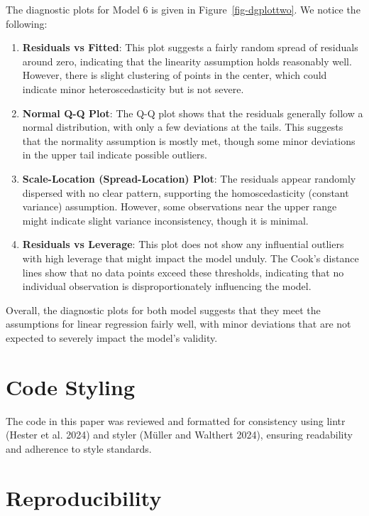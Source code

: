 \documentclass[
  letterpaper,
  DIV=11,
  numbers=noendperiod]{scrartcl}
\begin{document}
The diagnostic plots for Model 6 is given in Figure~\ref{fig-dgplottwo}.
We notice the following:

\begin{enumerate}
\def\labelenumi{\arabic{enumi}.}
\item
  \textbf{Residuals vs Fitted}: This plot suggests a fairly random
  spread of residuals around zero, indicating that the linearity
  assumption holds reasonably well. However, there is slight clustering
  of points in the center, which could indicate minor heteroscedasticity
  but is not severe.
\item
  \textbf{Normal Q-Q Plot}: The Q-Q plot shows that the residuals
  generally follow a normal distribution, with only a few deviations at
  the tails. This suggests that the normality assumption is mostly met,
  though some minor deviations in the upper tail indicate possible
  outliers.
\item
  \textbf{Scale-Location (Spread-Location) Plot}: The residuals appear
  randomly dispersed with no clear pattern, supporting the
  homoscedasticity (constant variance) assumption. However, some
  observations near the upper range might indicate slight variance
  inconsistency, though it is minimal.
\item
  \textbf{Residuals vs Leverage}: This plot does not show any
  influential outliers with high leverage that might impact the model
  unduly. The Cook's distance lines show that no data points exceed
  these thresholds, indicating that no individual observation is
  disproportionately influencing the model.
\end{enumerate}

Overall, the diagnostic plots for both model suggests that they meet the
assumptions for linear regression fairly well, with minor deviations
that are not expected to severely impact the model's validity.

\hypertarget{code-styling}{%
\section{Code Styling}\label{code-styling}}

The code in this paper was reviewed and formatted for consistency using
lintr (Hester et al. 2024) and styler (Müller and Walthert 2024),
ensuring readability and adherence to style standards.

\hypertarget{reproducibility}{%
\section{Reproducibility}\label{reproducibility}}
\end{document}
